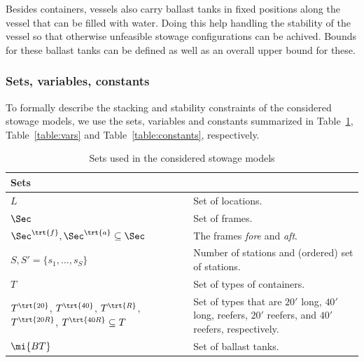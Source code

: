 Besides containers, vessels also carry ballast tanks in fixed positions along the vessel that can be filled with water. Doing this help handling the stability of the vessel so that otherwise unfeasible stowage configurations can be {achived}. {Bounds for these ballast tanks can be defined as well as an overall upper bound for these.}

\subsubsection*{Sets, variables, constants}
To formally describe the stacking and stability constraints of the considered stowage models, we use the sets, variables and constants summarized in Table~\ref{table:sets}, Table~\ref{table:vars} and Table~\ref{table:constants}, respectively.
\begin{table}[p]
\centering
\begin{tabular}{p{5cm}p{7.5cm}}%
\multicolumn{2}{l}{\textbf{Sets}}\\
\hline\noalign{\smallskip}
$L$ 
	& Set of locations.\\
$\Sec$
	&Set of frames.\\
$\Sec^{\trt{f}},\Sec^\trt{a}\subseteq \Sec$
	&The frames \emph{fore} and \emph{aft}.\\
$S, S' = \{s_1,\ldots, s_S\}$ 
	&Number of stations and (ordered) set of stations.\\
$T$
	&Set of types of containers.\\ 
$T^\trt{20}$, $T^\trt{40}$, $T^\trt{R}$, $T^\trt{20R}$, $T^\trt{40R}\subseteq T$ 
	&Set of types that are $20'$ long, $40'$ long, reefers, $20'$ reefers, and $40'$ reefers, respectively.\\ 
$\mi{BT}$ 
	& Set of ballast tanks.\\
\end{tabular}
\caption{Sets used in the considered stowage models}
\label{table:sets}
\end{table}
%
